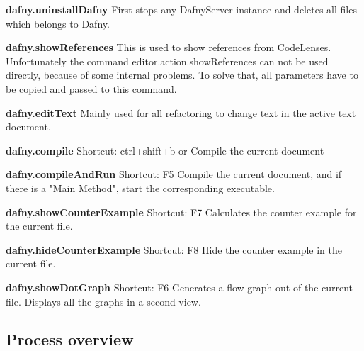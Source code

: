 \textbf{dafny.uninstallDafny}
First stops any DafnyServer instance and deletes all files which belongs to Dafny. \newline

\textbf{dafny.showReferences}
This is used to show references from CodeLenses. Unfortunately the command editor.action.showReferences can not be used directly, because of some internal problems. To solve that, all parameters have to be copied and passed to this command. \newline

\textbf{dafny.editText}
Mainly used for all refactoring to change text in the active text document. \newline

\textbf{dafny.compile}
Shortcut: ctrl+shift+b or %
\newline
Compile the current document \newline

\textbf{dafny.compileAndRun}
Shortcut: F5
\newline
Compile the current document, and if there is a "Main Method", start the corresponding executable. \newline

\textbf{dafny.showCounterExample}
Shortcut: F7
\newline
Calculates the counter example for the current file. \newline


\textbf{dafny.hideCounterExample}
Shortcut: F8
\newline
Hide the counter example in the current file.  \newline

\textbf{dafny.showDotGraph}
Shortcut: F6
\newline
Generates a flow graph out of the current file. Displays all the graphs in a second view. \newline


\subsection{Process overview}

